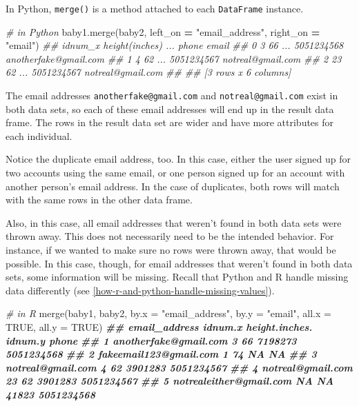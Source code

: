 \documentclass[
  12pt,
  krantz2]{krantz}
\makeatletter
\newenvironment{Shaded}{\begin{snugshade}}{\end{snugshade}}
\newcommand{\AttributeTok}[1]{\textcolor[rgb]{0.61,0.61,0.61}{#1}}
\newcommand{\CommentTok}[1]{\textcolor[rgb]{0.37,0.37,0.37}{\textit{#1}}}
\newcommand{\ConstantTok}[1]{\textcolor[rgb]{0,0,0}{#1}}
\newcommand{\DocumentationTok}[1]{\textcolor[rgb]{0.37,0.37,0.37}{\textbf{\textit{#1}}}}
\newcommand{\FunctionTok}[1]{\textcolor[rgb]{0,0,0}{#1}}
\newcommand{\NormalTok}[1]{#1}
\newcommand{\OperatorTok}[1]{\textcolor[rgb]{0.43,0.43,0.43}{\textbf{#1}}}
\newcommand{\StringTok}[1]{\textcolor[rgb]{0.5,0.5,0.5}{#1}}
\newenvironment{kframe}{%
\medskip{}
\setlength{\fboxsep}{.8em}
 \def\at@end@of@kframe{}%
 \ifinner\ifhmode%
  \def\at@end@of@kframe{\end{minipage}}%
  \begin{minipage}{\columnwidth}%
 \fi\fi%
 \def\FrameCommand##1{\hskip\@totalleftmargin \hskip-\fboxsep
 \colorbox{shadecolor}{##1}\hskip-\fboxsep
     \hskip-\linewidth \hskip-\@totalleftmargin \hskip\columnwidth}%
 \MakeFramed {\advance\hsize-\width
   \@totalleftmargin\z@ \linewidth\hsize
   \@setminipage}}%
 {\par\unskip\endMakeFramed%
 \at@end@of@kframe}
\renewenvironment{Shaded}{\begin{kframe}}{\end{kframe}}
\makeatother
\begin{document}
In Python, \texttt{merge()} is a method attached to each \texttt{DataFrame} instance.

\begin{Shaded}
\begin{Highlighting}[]
\CommentTok{\# in Python}
\NormalTok{baby1.merge(baby2, left\_on }\OperatorTok{=} \StringTok{"email\_address"}\NormalTok{, right\_on }\OperatorTok{=} \StringTok{"email"}\NormalTok{)}
\CommentTok{\#\#    idnum\_x  height(inches)  ...       phone                  email}
\CommentTok{\#\# 0        3              66  ...  5051234568  anotherfake@gmail.com}
\CommentTok{\#\# 1        4              62  ...  5051234567      notreal@gmail.com}
\CommentTok{\#\# 2       23              62  ...  5051234567      notreal@gmail.com}
\CommentTok{\#\# }
\CommentTok{\#\# [3 rows x 6 columns]}
\end{Highlighting}
\end{Shaded}

The email addresses \texttt{anotherfake@gmail.com} and \texttt{notreal@gmail.com} exist in both data sets, so each of these email addresses will end up in the result data frame. The rows in the result data set are wider and have more attributes for each individual.

Notice the duplicate email address, too. In this case, either the user signed up for two accounts using the same email, or one person signed up for an account with another person's email address. In the case of duplicates, both rows will match with the same rows in the other data frame.

Also, in this case, all email addresses that weren't found in both data sets were thrown away. This does not necessarily need to be the intended behavior. For instance, if we wanted to make sure no rows were thrown away, that would be possible. In this case, though, for email addresses that weren't found in both data sets, some information will be missing. Recall that Python and R handle missing data differently (see \ref{how-r-and-python-handle-missing-values}).

\begin{Shaded}
\begin{Highlighting}[]
\CommentTok{\# in R}
\FunctionTok{merge}\NormalTok{(baby1, baby2, }
      \AttributeTok{by.x =} \StringTok{"email\_address"}\NormalTok{, }\AttributeTok{by.y =} \StringTok{"email"}\NormalTok{, }
      \AttributeTok{all.x =} \ConstantTok{TRUE}\NormalTok{, }\AttributeTok{all.y =} \ConstantTok{TRUE}\NormalTok{)}
\DocumentationTok{\#\#             email\_address idnum.x height.inches. idnum.y      phone}
\DocumentationTok{\#\# 1   anotherfake@gmail.com       3             66 7198273 5051234568}
\DocumentationTok{\#\# 2  fakeemail123@gmail.com       1             74      NA         NA}
\DocumentationTok{\#\# 3       notreal@gmail.com       4             62 3901283 5051234567}
\DocumentationTok{\#\# 4       notreal@gmail.com      23             62 3901283 5051234567}
\DocumentationTok{\#\# 5 notrealeither@gmail.com      NA             NA   41823 5051234568}
\end{Highlighting}
\end{Shaded}
\end{document}
